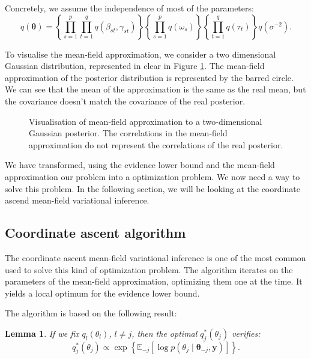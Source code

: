 \documentclass{article}
\numberwithin{equation}{section}
\newtheorem{lemma}{Lemma}[section]
\begin{document}
Concretely, we assume the independence of most of the parameters:
\begin{equation*}
q(\boldsymbol{\theta}) =\left\lbrace\prod_{s=1}^p \prod_{t=1}^q q(\beta_{st}, \gamma_{st})\right\rbrace \left\lbrace\prod_{s=1}^p  q(\omega_s)\right\rbrace \left\lbrace\prod_{t=1}^q q(\tau_t)\right\rbrace q(\sigma^{-2}).
\end{equation*}

To visualise the mean-field approximation, we consider a two dimensional Gaussian distribution, represented in clear in Figure \ref{fig:mean_field}. The mean-field approximation of the posterior distribution is represented by the barred circle. We can see that the mean of the approximation is the same as the real mean, but the covariance doesn't match the covariance of the real posterior.

\begin{figure}[h!]
\centering
{}
\caption{\label{fig:mean_field}Visualisation of mean-field approximation to a two-dimensional Gaussian posterior. The correlations in the mean-field approximation do not represent the correlations of the real posterior.}
\end{figure}

We have transformed, using the evidence lower bound and the mean-field approximation our problem into a optimization problem. We now need a way to solve this problem. In the following section, we will be looking at the coordinate ascend mean-field variational inference.
\subsection{Coordinate ascent algorithm}
The coordinate ascent mean-field variational inference  is one of the most common used to solve this kind of optimization problem. The algorithm iterates on the parameters of the mean-field approximation, optimizing them one at the time. It yields a local optimum for the evidence lower bound.

The algorithm is based on the following result:
\begin{lemma}

If we fix $q_l(\theta_l)$, $l\neq j$, then the optimal $q^*_j(\theta_j)$ verifies:
\begin{equation*}
q^*_j(\theta_j) \propto \exp\left\lbrace\mathbb{E}_{-j}\left[\log p(\theta_j \mid \boldsymbol{\theta}_{-j}, \boldsymbol{y})\right]\right\rbrace.
\end{equation*}

\end{lemma}
\end{document}
